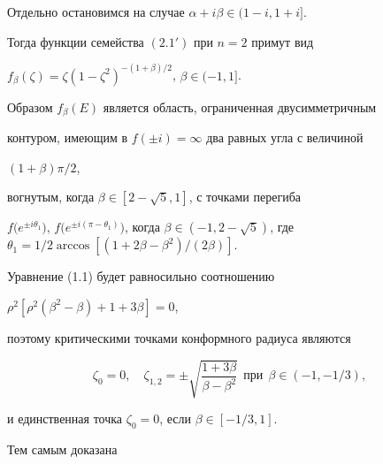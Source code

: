 Отдельно остановимся на случае $\alpha+i\beta\in(1-i,1+i]$.


Тогда функции семейства $(2.1')$ при $n=2$ примут вид


$f_\beta(\zeta)=\zeta(1-\zeta^2)^{-(1+\beta)/2}$, $\beta\in(-1,1]$.





Образом $f_\beta(E)$ является область, ограниченная двусимметричным


контуром, имеющим в $f(\pm i)=\infty$ два равных угла с величиной


$(1+\beta)\pi/2$,


вогнутым, когда $\beta\in[2-\sqrt 5,1]$, с точками перегиба


$f\big(e^{\pm i\theta_1}\big)$, $f\big(e^{\pm i(\pi-\theta_1)}


\big)$, когда $\beta\in(-1,2-\sqrt 5)$, где $\theta_1=1/2\arccos


[(1+2\beta-\beta^2)/(2\beta)]$.





Уравнение (1.1) будет равносильно соотношению


$\rho^2[\rho^2(\beta^2-\beta)+1+3\beta]=0$,


поэтому критическими точками конформного радиуса являются


\begin{equation}


\zeta_0=0, \quad \zeta_{1,2}=\pm\sqrt{\frac{1+3\beta}{\beta-\beta^2}}


\ \ \text{при}\ \ \beta\in(-1,-1/3),


\end{equation}


и единственная точка $\zeta_0=0$, если $\beta\in[-1/3,1]$.


Тем самым доказана





